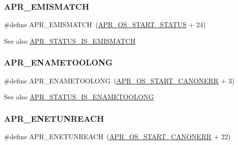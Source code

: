 \subsubsection{\texorpdfstring{A\+P\+R\+\_\+\+E\+M\+I\+S\+M\+A\+T\+CH}{APR\_EMISMATCH}}
{\footnotesize\ttfamily \#define A\+P\+R\+\_\+\+E\+M\+I\+S\+M\+A\+T\+CH~(\mbox{\hyperlink{group__apr__errno_ga450e1a5734732e092ddaa5b67414f69b}{A\+P\+R\+\_\+\+O\+S\+\_\+\+S\+T\+A\+R\+T\+\_\+\+S\+T\+A\+T\+US}} + 24)}

\begin{DoxySeeAlso}{See also}
\mbox{\hyperlink{group___a_p_r___s_t_a_t_u_s___i_s_ga7234b0d01a8e3ea8e5345f3f242df030}{A\+P\+R\+\_\+\+S\+T\+A\+T\+U\+S\+\_\+\+I\+S\+\_\+\+E\+M\+I\+S\+M\+A\+T\+CH}} 
\end{DoxySeeAlso}
\mbox{\label{group___a_p_r___error_ga3db63b16c2b332efe441e2661f593377}} 
\subsubsection{\texorpdfstring{A\+P\+R\+\_\+\+E\+N\+A\+M\+E\+T\+O\+O\+L\+O\+NG}{APR\_ENAMETOOLONG}}
{\footnotesize\ttfamily \#define A\+P\+R\+\_\+\+E\+N\+A\+M\+E\+T\+O\+O\+L\+O\+NG~(\mbox{\hyperlink{group__apr__errno_ga7bca957c11b80b31cb54b0d2cbe9e025}{A\+P\+R\+\_\+\+O\+S\+\_\+\+S\+T\+A\+R\+T\+\_\+\+C\+A\+N\+O\+N\+E\+RR}} + 3)}

\begin{DoxySeeAlso}{See also}
\mbox{\hyperlink{group___a_p_r___s_t_a_t_u_s___i_s_gad39fb68ea626722634f81a764b3626df}{A\+P\+R\+\_\+\+S\+T\+A\+T\+U\+S\+\_\+\+I\+S\+\_\+\+E\+N\+A\+M\+E\+T\+O\+O\+L\+O\+NG}} 
\end{DoxySeeAlso}
\mbox{\label{group___a_p_r___error_gab9b7124a88817d1b69cdef059f7dc689}} 
\subsubsection{\texorpdfstring{A\+P\+R\+\_\+\+E\+N\+E\+T\+U\+N\+R\+E\+A\+CH}{APR\_ENETUNREACH}}
{\footnotesize\ttfamily \#define A\+P\+R\+\_\+\+E\+N\+E\+T\+U\+N\+R\+E\+A\+CH~(\mbox{\hyperlink{group__apr__errno_ga7bca957c11b80b31cb54b0d2cbe9e025}{A\+P\+R\+\_\+\+O\+S\+\_\+\+S\+T\+A\+R\+T\+\_\+\+C\+A\+N\+O\+N\+E\+RR}} + 22)}

